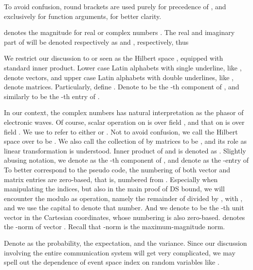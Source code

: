 \starttitle [title={Notation}]

To avoid confusion, round brackets \m {\RB {\cdot}} are used purely for precedence of , and \m {\SB {\cdot}} exclusively for function arguments, for better clarity.

 denotes the magnitude for real or complex numbers .
The real and imaginary part of  will be denoted respectively as  and , respectively, thus 

We restrict our discussion to  or  seen as the Hilbert space , equipped with standard inner product.
Lower case Latin alphabets with single underline, like , denote vectors, and upper case Latin alphabets with double underlines, like , denote matrices.
Particularly, define .
Denote  to be the -th component of , and similarly  to be the -th entry of .

In our context, the complex numbers has natural interpretation as the phasor of electronic waves.
Of course, scalar operation on  is over field , and that on  is over field .
We use  to refer to either  or .
Not to avoid confusion, we call the Hilbert space  over  to be .
We also call the collection of  by  matrices to be , and its role as linear transformation is understood.
Inner product of  and  is denoted as .
Slightly abusing notation, we denote as  the -th component of , and denote as  the -entry of 
To better correspond to the pseudo code, the numbering of both vector and matrix entries are zero-based, that is, numbered from .
Especially when manipulating the indices, but also in the main proof of DS bound, we will encounter the modulo as operation, namely the remainder of  divided by , with , and we use the capital  to denote that number.
And we denote  to be the -th unit vector in the Cartesian coordinates, whose numbering is also zero-based.
 denotes the -norm of vector .
Recall that \m {\ell_\infty}-norm is the maximum-magnitude norm.

Denote as  the probability,  the expectation, and  the variance.
Since our discussion involving the entire communication system will get very complicated, we may spell out the dependence of event space index on random variables like .

\stopchapter
